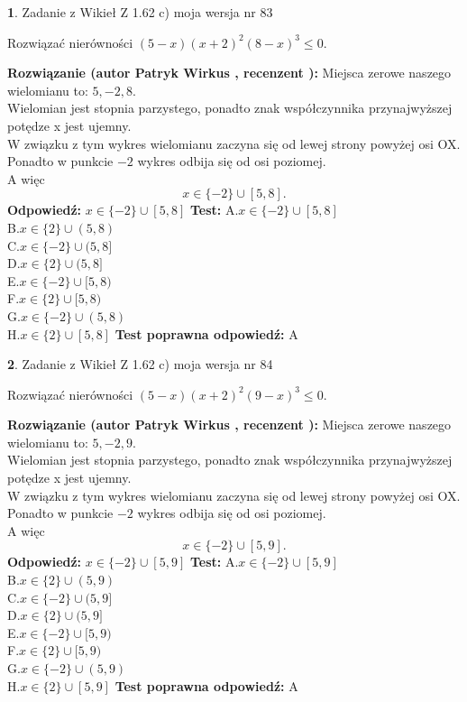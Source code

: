 \documentclass[12pt, a4paper]{article}
\theoremstyle{definition} %
\newtheorem{zad}{}
\newcommand{\zadStart}[1]{\begin{zad}#1\newline}
\newcommand{\zadStop}{\end{zad}}
\newcommand{\rozwStart}[2]{\noindent \textbf{Rozwiązanie (autor #1 , recenzent #2): }\newline}
\newcommand{\rozwStop}{\newline}
\newcommand{\odpStart}{\noindent \textbf{Odpowiedź:}\newline}
\newcommand{\odpStop}{\newline}
\newcommand{\testStart}{\noindent \textbf{Test:}\newline}
\newcommand{\testStop}{\newline}
\newcommand{\kluczStart}{\noindent \textbf{Test poprawna odpowiedź:}\newline}
\newcommand{\kluczStop}{\newline}
\begin{document}
\zadStart{Zadanie z Wikieł Z 1.62 c) moja wersja nr 83}

Rozwiązać nierówności $(5-x)(x+2)^{2}(8-x)^{3}\le0$.
\zadStop
\rozwStart{Patryk Wirkus}{}
Miejsca zerowe naszego wielomianu to: $5, -2, 8$.\\
Wielomian jest stopnia parzystego, ponadto znak współczynnika przy\linebreak najwyższej potędze x jest ujemny.\\ W związku z tym wykres wielomianu zaczyna się od lewej strony powyżej osi OX.\\
Ponadto w punkcie $-2$ wykres odbija się od osi poziomej.\\
A więc $$x \in \{-2\} \cup [5,8].$$
\rozwStop
\odpStart
$x \in \{-2\} \cup [5,8]$
\odpStop
\testStart
A.$x \in \{-2\} \cup [5,8]$\\
B.$x \in \{2\} \cup (5,8)$\\
C.$x \in \{-2\} \cup (5,8]$\\
D.$x \in \{2\} \cup (5,8]$\\
E.$x \in \{-2\} \cup [5,8)$\\
F.$x \in \{2\} \cup [5,8)$\\
G.$x \in \{-2\} \cup (5,8)$\\
H.$x \in \{2\} \cup [5,8]$
\testStop
\kluczStart
A
\kluczStop



\zadStart{Zadanie z Wikieł Z 1.62 c) moja wersja nr 84}

Rozwiązać nierówności $(5-x)(x+2)^{2}(9-x)^{3}\le0$.
\zadStop
\rozwStart{Patryk Wirkus}{}
Miejsca zerowe naszego wielomianu to: $5, -2, 9$.\\
Wielomian jest stopnia parzystego, ponadto znak współczynnika przy\linebreak najwyższej potędze x jest ujemny.\\ W związku z tym wykres wielomianu zaczyna się od lewej strony powyżej osi OX.\\
Ponadto w punkcie $-2$ wykres odbija się od osi poziomej.\\
A więc $$x \in \{-2\} \cup [5,9].$$
\rozwStop
\odpStart
$x \in \{-2\} \cup [5,9]$
\odpStop
\testStart
A.$x \in \{-2\} \cup [5,9]$\\
B.$x \in \{2\} \cup (5,9)$\\
C.$x \in \{-2\} \cup (5,9]$\\
D.$x \in \{2\} \cup (5,9]$\\
E.$x \in \{-2\} \cup [5,9)$\\
F.$x \in \{2\} \cup [5,9)$\\
G.$x \in \{-2\} \cup (5,9)$\\
H.$x \in \{2\} \cup [5,9]$
\testStop
\kluczStart
A
\kluczStop
\end{document}
